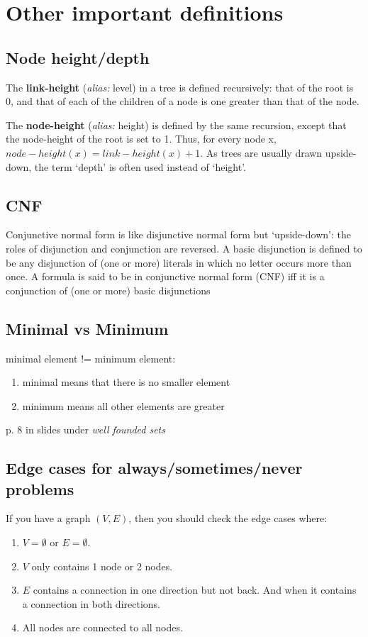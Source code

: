 \documentclass[twocolumn,a4paper]{article}
\begin{document}
\newpage
\section*{Other important definitions}
\subsection*{Node height/depth}
The \textbf{link-height} (\emph{alias:} level) in a tree is defined recursively: that of the root is 0, 
and that of each of the children of a node is one greater than that of the node.

The \textbf{node-height} (\emph{alias:} height) is defined by the same recursion,
except that the node-height of the root is set to 1.
Thus, for every node x, \(node-height(x) = link-height(x) + 1\).
As trees are usually drawn upside-down, the term `depth' is often used instead of `height'.

\subsection*{CNF}
Conjunctive normal form is like disjunctive normal form but `upside-down': the roles of disjunction and conjunction are reversed.
A basic disjunction is defined to be any disjunction of (one or more) literals in which no letter occurs more than once.
A formula is said to be in conjunctive normal form (CNF) iff it is a conjunction of (one or more) basic disjunctions

\subsection*{Minimal vs Minimum}
minimal element != minimum element:
\begin{enumerate}
	\item minimal means that there is no smaller element
	\item minimum means all other elements are greater
\end{enumerate}
p. 8 in slides under \emph{well founded sets}

\subsection*{Edge cases for always/sometimes/never problems}
If you have a graph \((V, E)\), then you should check the edge cases where:
\begin{enumerate}
	\item \(V=\emptyset \) or \(E=\emptyset \).
	\item \(V\) only contains 1 node or 2 nodes.
	\item \(E\) contains a connection in one direction but not back. And when it contains a connection in both directions.
	\item All nodes are connected to all nodes.
\end{enumerate}
\end{document}
